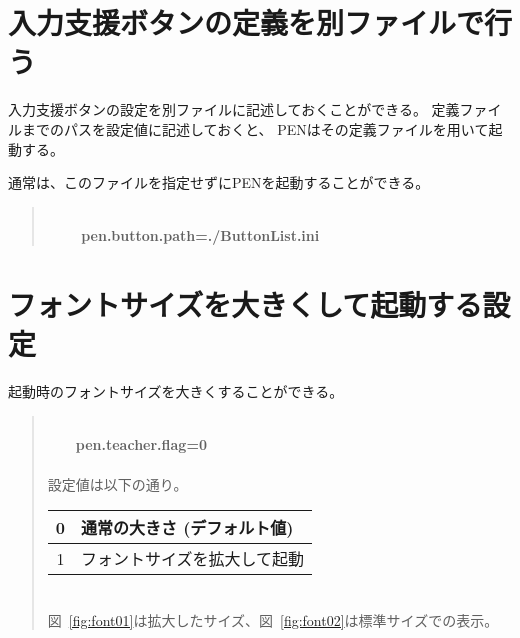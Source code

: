 \documentclass[10pt,a4j]{jarticle}
\begin{document}
\section{入力支援ボタンの定義を別ファイルで行う}

入力支援ボタンの設定を別ファイルに記述しておくことができる。
定義ファイルまでのパスを設定値に記述しておくと、
PENはその定義ファイルを用いて起動する。

通常は、このファイルを指定せずにPENを起動することができる。

\begin{quotation}
\noindent [使用例]\\
~~~~{\bf{ pen.button.path=./ButtonList.ini}}

\end{quotation}

\section{フォントサイズを大きくして起動する設定}

起動時のフォントサイズを大きくすることができる。

\begin{quotation}
\noindent [使用例]\\
~~~~{\bf{pen.teacher.flag=0}}\\
\ \\
設定値は以下の通り。\\

\begin{tabular}{c|l}
\hline
0 & 通常の大きさ (デフォルト値)\\
\hline
1 & フォントサイズを拡大して起動 \\
\hline
\end{tabular}\\


図~\ref{fig:font01}は拡大したサイズ、図~\ref{fig:font02}は標準サイズでの表示。

\end{quotation}
\end{document}

